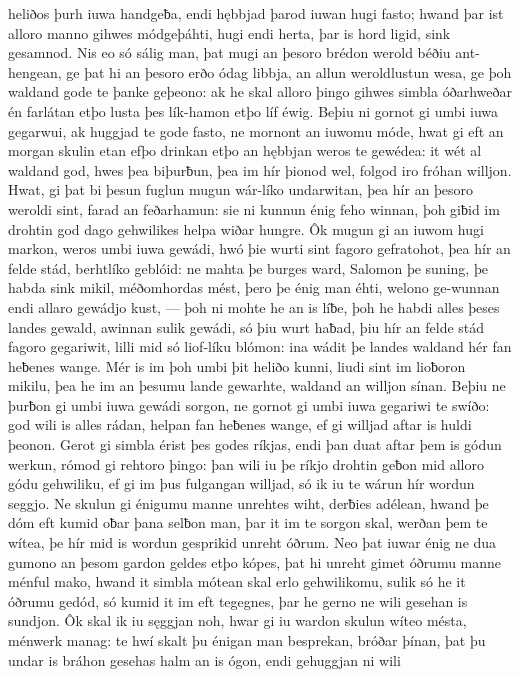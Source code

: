 heliðos þurh iuwa handgeƀa, endi hębbjad þarod iuwan hugi fasto;
hwand þar ist alloro manno gihwes módgeþáhti,
hugi endi herta, þar is hord ligid,
sink gesamnod. Nis eo só sálig man,
þat mugi an þesoro brédon werold béðiu ant-hengean,
ge þat hi an þesoro erðo ódag libbja,
an allun weroldlustun wesa, ge þoh waldand gode
te þanke geþeono: ak he skal alloro þingo gihwes
simbla óðarhweðar én farlátan
etþo lusta þes lík-hamon etþo líf éwig.
Beþiu ni gornot gi umbi iuwa gegarwui, ak huggjad te gode fasto,
ne mornont an iuwomu móde, hwat gi eft an morgan skulin
etan efþo drinkan etþo an hębbjan
weros te gewédea: it wét al waldand god,
hwes þea biþurƀun, þea im hír þionod wel,
folgod iro fróhan willjon. Hwat, gi þat bi þesun fuglun mugun
wár-líko undarwitan, þea hír an þesoro weroldi sint,
farad an feðarhamun: sie ni kunnun énig feho winnan,
þoh giƀid im drohtin god dago gehwilikes
helpa wiðar hungre. Ôk mugun gi an iuwom hugi markon,
weros umbi iuwa gewádi, hwó þie wurti sint
fagoro gefratohot, þea hír an felde stád,
berhtlíko geblóid: ne mahta þe burges ward,
Salomon þe suning, þe habda sink mikil,
méðomhordas mést, þero þe énig man éhti,
welono ge-wunnan endi allaro gewádjo kust, —
þoh ni mohte he an is líƀe, þoh he habdi alles þeses landes gewald,
awinnan sulik gewádi, só þiu wurt haƀad,
þiu hír an felde stád fagoro gegariwit,
lilli mid só liof-líku blómon: ina wádit þe landes waldand
hér fan heƀenes wange. Mér is im þoh umbi þit heliðo kunni,
liudi sint im lioƀoron mikilu, þea he im an þesumu lande gewarhte,
waldand an willjon sínan. Beþiu ne þurƀon gi umbi iuwa gewádi sorgon,
ne gornot gi umbi iuwa gegariwi te swíðo: god wili is alles rádan,
helpan fan heƀenes wange, ef gi willjad aftar is huldi þeonon.
Gerot gi simbla érist þes godes ríkjas, endi þan duat aftar þem is gódun werkun,
rómod gi rehtoro þingo: þan wili iu þe ríkjo drohtin
geƀon mid alloro gódu gehwiliku, ef gi im þus fulgangan willjad,
só ik iu te wárun hír wordun seggjo.
Ne skulun gi énigumu manne unrehtes wiht,
derƀies adélean, hwand þe dóm eft kumid
oƀar þana selƀon man, þar it im te sorgon skal,
werðan þem te wítea, þe hír mid is wordun gesprikid
unreht óðrum. Neo þat iuwar énig ne dua
gumono an þesom gardon geldes etþo kópes,
þat hi unreht gimet óðrumu manne
ménful mako, hwand it simbla mótean skal
erlo gehwilikomu, sulik só he it óðrumu gedód,
só kumid it im eft tegegnes, þar he gerno ne wili
gesehan is sundjon. Ôk skal ik iu sęggjan noh,
hwar gi iu wardon skulun wíteo mésta,
ménwerk manag: te hwí skalt þu énigan man besprekan,
bróðar þínan, þat þu undar is bráhon gesehas
halm an is ógon, endi gehuggjan ni wili
